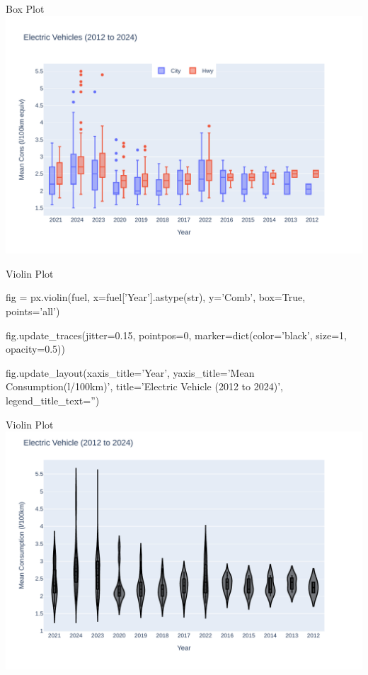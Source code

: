 \documentclass[ignorenonframetext,xcolor=x11names]{beamer}
\begin{document}
\begin{frame}{Box Plot}
  \includegraphics[width=\textwidth]{px.fuel.box.pdf}
\end{frame}

\begin{frame}[fragile]{Violin Plot}
\footnotesize
\begin{pythoncode}
fig = px.violin(fuel, 
       x=fuel['Year'].astype(str), 
       y='Comb', box=True, 
       points='all')

fig.update_traces(jitter=0.15, pointpos=0, 
       marker=dict(color='black', size=1, opacity=0.5))

fig.update_layout(xaxis_title='Year',
       yaxis_title='Mean Consumption\n(l/100km)',
       title='Electric Vehicle (2012 to 2024)',
       legend_title_text='')
\end{pythoncode}
\end{frame}

\begin{frame}{Violin Plot}
  \includegraphics[width=\textwidth]{px.fuel.violin.pdf}
\end{frame}
\end{document}

